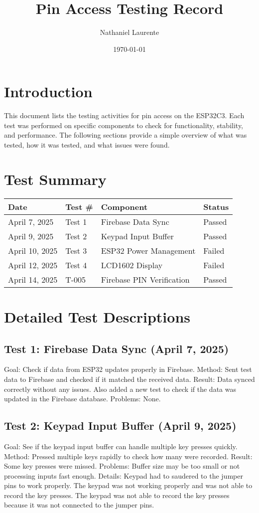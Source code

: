 \documentclass{article}
\title{Pin Access Testing Record}
\author{Nathaniel Laurente}
\date{\today}
\begin{document}
\maketitle

\section*{Introduction}
This document lists the testing activities for pin access on the ESP32C3. Each test was performed on specific components to check for functionality, stability, and performance. The following sections provide a simple overview of what was tested, how it was tested, and what issues were found.

\section*{Test Summary}
\begin{tabular}{| l | l | l | l |}
\hline
\textbf{Date} & \textbf{Test \#} & \textbf{Component} & \textbf{Status} \\
\hline
April 7, 2025 & Test 1 & Firebase Data Sync & Passed \\
April 9, 2025 & Test 2 & Keypad Input Buffer & Passed \\
April 10, 2025 & Test 3 & ESP32 Power Management & Failed \\
April 12, 2025 & Test 4 & LCD1602 Display & Failed \\
April 14, 2025 & T-005 & Firebase PIN Verification & Passed \\



\hline
\end{tabular}

\section*{Detailed Test Descriptions}

\subsection*{Test 1: Firebase Data Sync (April 7, 2025)}
Goal: Check if data from ESP32 updates properly in Firebase.
Method: Sent test data to Firebase and checked if it matched the received data.
Result: Data synced correctly without any issues. Also added a new test to check if the data was updated in the Firebase database.
Problems: None.

\subsection*{Test 2: Keypad Input Buffer (April 9, 2025)}
Goal: See if the keypad input buffer can handle multiple key presses quickly.
Method: Pressed multiple keys rapidly to check how many were recorded.
Result: Some key presses were missed.
Problems: Buffer size may be too small or not processing inputs fast enough.
Details: Keypad had to saudered to the jumper pins to work properly. The keypad was not working properly and was not able to record the key presses. The keypad was not able to record the key presses because it was not connected to the jumper pins. 
\end{document}
